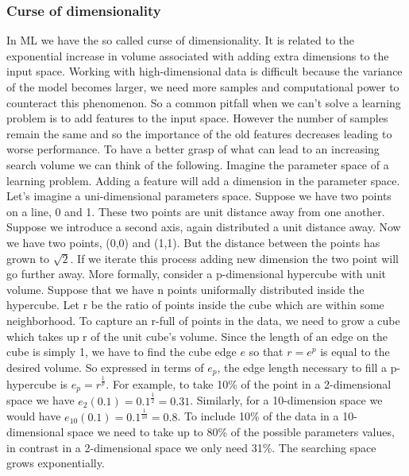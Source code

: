 \documentclass[main.tex]{subfiles}
\begin{document}
\subsubsection{Curse of dimensionality} In ML we have the so called curse of dimensionality. It is related to the exponential increase in volume associated with adding extra dimensions to the input space. Working with high-dimensional data is difficult because the variance of the model becomes larger, we need more samples and computational power to counteract this phenomenon. So a common pitfall when we can't solve a learning problem is to add features to the input space. However the number of samples remain the same and so the importance of the old features decreases leading to worse performance. To have a better grasp of what can lead to an increasing search volume we can think of the following. Imagine the parameter space of a learning problem. Adding a feature will add a dimension in the parameter space. Let's imagine a uni-dimensional parameters space. Suppose we have two points on a line, 0 and 1. These two points are unit distance away from one another. Suppose we introduce a second axis, again distributed a unit distance away. Now we have two points, (0,0) and (1,1). But the distance between the points has grown to $\sqrt{2}$. If we iterate this process adding new dimension the two point will go further away. More formally, consider a p-dimensional hypercube with unit volume. Suppose that we have n points uniformally distributed inside the hypercube. Let r be the ratio of points inside the cube which are within some neighborhood. To capture an r-full of points in the data, we need to grow a cube which takes up r of the unit cube's volume. Since the length of an edge on the cube is simply 1, we have to find the cube edge $e$ so that $r=e^p$ is equal to the desired volume.
So expressed in terms of $e_p$, the edge length necessary to fill a p-hypercube is $e_p=r^{\frac{1}{p}}$. For example, to take 10\% of the point in a 2-dimensional space we have $e_2(0.1)=0.1^{\frac{1}{2}}=0.31$. Similarly, for a 10-dimension space we would have $e_{10}(0.1)=0.1^{\frac{1}{10}}=0.8$. To include 10\% of the data in a 10-dimensional space we need to take up to 80\% of the possible parameters values, in contrast in a 2-dimensional space we only need 31\%. The searching space grows exponentially.
\end{document}
